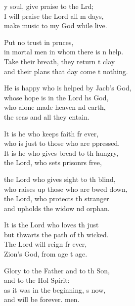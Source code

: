 \settowidth{\versewidth}{He is happy who is helped by Jacob’s God, *}
\begin{psalmverse}%
  \begin{patverse}
y soul, give praise to the Lrd;\Flex\\
I will praise the Lord all m days,\Med\\
make music to my God while  live.

Put no trust in prnces,\Med\\
in mortal men in whom there is n help.\\
Take their breath, they return t clay\Med\\
and their plans that day come t nothing.

He is happy who is helped by Jacb’s God,\Med\\
whose hope is in the Lord h\pointup{\i}s God,\\
who alone made heaven nd earth,\Med\\
the seas and all they cntain.

It is he who keeps faith fr ever,\Med\\
who is just to those who are ppressed.\\
It is he who gives bread to th hungry,\Med\\
the Lord, who sets prisonrs free,

the Lord who gives sight to th blind,\Med\\
who raises up those who are bwed down,\\
the Lord, who protects th stranger\Med\\
and upholds the widow nd orphan.

It is the Lord who loves th just\Med\\
but thwarts the path of th wicked.\\
The Lord will reign fr ever,\Med\\
Zion’s God, from age t age.

Glory to the Father and to th Son,\Med\\
and to the Hol Spirit:\\
as it was in the beginning, \pointup{\i}s now,\Med\\
and will be forever. men. 
  \end{patverse}
\end{psalmverse}
